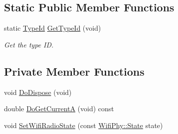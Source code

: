 \subsection*{Static Public Member Functions}
\begin{DoxyCompactItemize}
\item 
static \hyperlink{classns3_1_1TypeId}{Type\+Id} \hyperlink{classns3_1_1WifiRadioEnergyModel_a7898fc79812e8d7bb1141377bedb0a43}{Get\+Type\+Id} (void)
\begin{DoxyCompactList}\small\item\em Get the type ID. \end{DoxyCompactList}\end{DoxyCompactItemize}
\subsection*{Private Member Functions}
\begin{DoxyCompactItemize}
\item 
void \hyperlink{classns3_1_1WifiRadioEnergyModel_a7d7b71b58994dff4386b8d8926ff0e95}{Do\+Dispose} (void)
\item 
double \hyperlink{classns3_1_1WifiRadioEnergyModel_ac9ddb990f1840ae14cd5c1936fada06d}{Do\+Get\+CurrentA} (void) const 
\item 
void \hyperlink{classns3_1_1WifiRadioEnergyModel_a234b7ab06299179f03b29ce3480c0336}{Set\+Wifi\+Radio\+State} (const \hyperlink{classns3_1_1WifiPhy_af97408fa76f99797497b492758467143}{Wifi\+Phy\+::\+State} state)
\end{DoxyCompactItemize}
